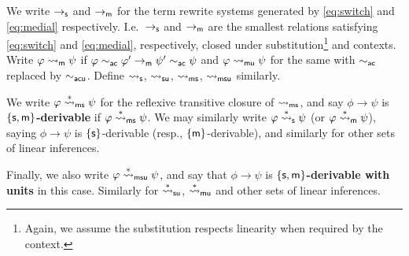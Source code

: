 \documentclass[a4paper, UKenglish, cleveref]{lipics-v2019}
\begin{document}
\begin{definition}[Rewriting]
We write $\to_{\mathsf{s}}$ and $\to_{\mathsf{m}}$ for the term rewrite systems generated by \eqref{eq:switch} and \eqref{eq:medial} respectively.
I.e.\ $\to_{\mathsf{s}}$ and $\to_{\mathsf{m}}$ are the smallest relations satisfying \eqref{eq:switch} and \eqref{eq:medial}, respectively, closed under substitution\footnote{Again, we assume the substitution respects linearity when required by the context.} and contexts. Write \(\varphi \rightsquigarrow_{\mathsf{m}} \psi\) if \(\varphi \sim_{\mathsf{ac}} \varphi' \to_{\mathsf{m}} \psi' \sim_{\mathsf{ac}} \psi\) and \(\varphi \rightsquigarrow_{\mathsf{m}\mathsf{u}} \psi\) for the same with \(\sim_{\mathsf{ac}}\) replaced by \(\sim_{\mathsf{acu}}\). Define \(\rightsquigarrow_{\mathsf{s}}\), \(\rightsquigarrow_{\mathsf{s}\mathsf{u}}\), \(\rightsquigarrow_{\mathsf{ms}}\), \(\rightsquigarrow_{\mathsf{msu}}\) similarly.

We write $\varphi \overset{*}{\rightsquigarrow}_{\mathsf{ms}} \psi$ for the reflexive transitive closure of \(\rightsquigarrow_{\mathsf{ms}}\), and say $\phi \to \psi$ is \textbf{$\{\mathsf{s},\mathsf{m}\}$-derivable} if \(\varphi \overset{*}{\rightsquigarrow}_{\mathsf{ms}} \psi\).
%
We may similarly write \(\varphi \overset{*}{\rightsquigarrow}_{\mathsf{s}} \psi\) (or \(\varphi \overset{*}{\rightsquigarrow}_{\mathsf{m}} \psi\)), saying $\phi \to \psi$ is $\{\mathsf{s}\}$-derivable (resp., $\{\mathsf{m}\}$-derivable), and similarly for other sets of linear inferences.

Finally, we also write \(\varphi \overset{*}{\rightsquigarrow}_{\mathsf{msu}} \psi\), and say that $\phi\to\psi$ is $\{\mathsf{s},\mathsf{m} \}$\textbf{-derivable with units} in this case.
Similarly for $\overset{*}{\rightsquigarrow}_{\mathsf{s}\mathsf{u}}$, $\overset{*}{\rightsquigarrow}_{\mathsf{m}\mathsf{u}}$ and other sets of linear inferences.
\end{definition}

%
\end{document}
